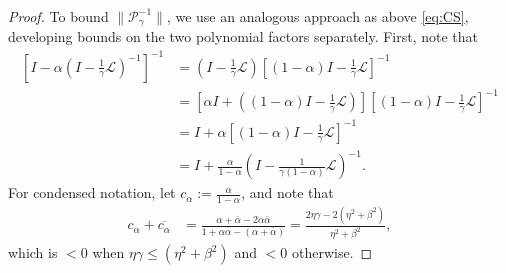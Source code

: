 \documentclass[review]{siamart}
\begin{document}
\begin{proof}
To bound $\|\mathcal{P}_\gamma^{-1}\|$, we use an analogous approach as above
\eqref{eq:CS}, developing bounds on the two polynomial factors separately.
First, note that
%
\begin{align*}
\left[I - \alpha\left(I - \tfrac{1}{\gamma}\mathcal{L}\right)^{-1}\right]^{-1}
	& = \left(I - \tfrac{1}{\gamma}\mathcal{L}\right)
		\left[(1-\alpha)I - \tfrac{1}{\gamma}\mathcal{L}\right]^{-1} \\
& = \left[\alpha I + ((1-\alpha)I - \tfrac{1}{\gamma}\mathcal{L})\right]
		\left[(1-\alpha)I - \tfrac{1}{\gamma}\mathcal{L}\right]^{-1} \\
& = I + \alpha \left[(1-\alpha)I - \tfrac{1}{\gamma}\mathcal{L}\right]^{-1} \\
& = I + \frac{\alpha}{1-\alpha} \left(I - \tfrac{1}{\gamma(1-\alpha)}\mathcal{L}\right)^{-1}.
\end{align*}
%
For condensed notation, let $c_\alpha := \tfrac{\alpha}{1-\alpha}$, and note that 
%
\begin{align*} 
c_\alpha+\overline{c_\alpha} & = \frac{\alpha + \overline{\alpha} - 2\alpha\overline{\alpha}}
	{1 + \alpha\overline{\alpha} - (\alpha + \overline{\alpha})} 
= \frac{2\eta\gamma - 2(\eta^2+\beta^2)}{\eta^2+\beta^2},
\end{align*}
%
which is $< 0$ when $\eta\gamma \leq (\eta^2+\beta^2)$ and $<0$ otherwise. 


\end{proof}
\end{document}
